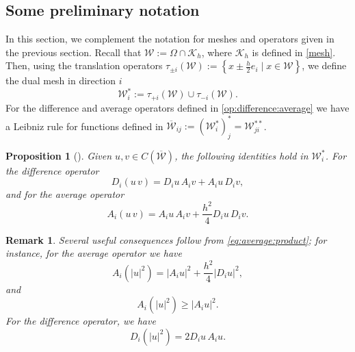 \documentclass{amsart}
\numberwithin{equation}{section}
\newtheorem{proposition}[theorem]{Proposition}
\newtheorem{remark}[theorem]{Remark}
\begin{document}
\subsection{Some preliminary notation}
In this section, we complement the notation for meshes and operators given in the previous section. Recall that $\mathcal{W}:= \Omega\cap\mathcal{K}_{h}$, where $\mathcal{K}_{h}$ is defined in \eqref{mesh}. Then, using the translation operators $\tau_{\pm i}(\mathcal{W}):= \left\{ x\pm\frac{h}{2}e_{i}\mid x\in \mathcal{W}\right\}$, we define the dual mesh in direction $i$  
\begin{equation}\label{sets:dual}
    \mathcal{W}_{i}^{\ast}:= \tau_{+i}\left( \mathcal{W}\right)\cup\tau_{-i}\left( \mathcal{W}\right).
\end{equation}
For the difference and average operators defined in \eqref{op:difference:average} we have a Leibniz rule for functions defined in $\overline{\mathcal{W}}_{ij}:= (\mathcal{W}_{i}^{\ast})_{j}^{\ast}=\mathcal{W}_{ji}^{\ast\ast}$.
\begin{proposition}[{\cite[Lemma 2.1]{E:DG:2011}}]\label{pro:product}
Given $u,v\in C(\overline{\mathcal{W}})$, the following identities hold in $\mathcal{W}^{\ast}_{i}$. For the difference operator
\begin{equation}\label{eq:difference:product}
    D_{i}(u\,v)=D_{i}u\, A_{i}v+A_{i}u\,D_{i}v,
    \end{equation}
and for the average operator \begin{equation}\label{eq:average:product}
     A_{i}(u\,v)= A_{i}u\,A_{i}v+\frac{h^{2}}{4}D_{i}u\,D_{i}v.
\end{equation}
\end{proposition}
\begin{remark} Several useful consequences follow from \eqref{eq:average:product}; for instance, for the average operator we have
\begin{equation}\label{eq:promediocuadrado}
    A_{i}(|u|^{2})=\left|A_{i}u \right|^{2}+\frac{h^{2}}{4}\left| D_{i}u\right|^{2},
\end{equation}
and 
\begin{equation}\label{eq:promedioinequality}
A_{i}(|u|^{2})\geq \left|A_{i}u\right|^{2}.
\end{equation}
For the difference operator, we have
\begin{equation}\label{eq:derivadacuadrado}
    D_{i}(|u|^{2})=2D_{i}u\,A_{i}u.
\end{equation}
\end{remark}
\end{document}

